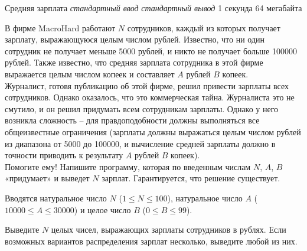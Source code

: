 \begin{problem}%
{Средняя зарплата}%
{\textsl{стандартный ввод}}%
{\textsl{стандартный вывод}}%
{1 секунда}%
{64 мегабайта}{}

В фирме MacroHard работают $N$ сотрудников, каждый из которых получает зарплату, выражающуюся целым числом рублей. Известно, что ни один сотрудник не получает меньше 5000 рублей, и никто не получает больше 100000 рублей. Также известно, что средняя зарплата сотрудника в этой фирме выражается целым числом копеек и составляет $A$ рублей $B$ копеек.\\

Журналист, готовя публикацию об этой фирме, решил привести зарплаты всех сотрудников. Однако оказалось, что это коммерческая тайна. Журналиста это не смутило, и он решил придумать всем сотрудникам зарплаты. Однако у него возникла сложность – для правдоподобности должны выполняться все общеизвестные ограничения (зарплаты должны выражаться целым числом рублей из диапазона от 5000 до 100000, и вычисление средней зарплаты должно в точности приводить к результату $A$ рублей $B$ копеек).\\

Помогите ему! Напишите программу, которая по введенным числам $N$, $A$, $B$ «придумает» и выведет $N$ зарплат. Гарантируется, что решение существует.

\InputFile

Вводятся натуральное число $N$ ($1 \le N \le 100$), натуральное число $A$ ($10000 \le A \le 30000$) и целое число $B$ ($0 \le B \le 99$).

\OutputFile

Выведите $N$ целых чисел, выражающих зарплаты сотрудников в рублях. Если возможных вариантов распределения зарплат несколько, выведите любой из них.

\Examples

\begin{example}
%
\end{example}
\end{problem}